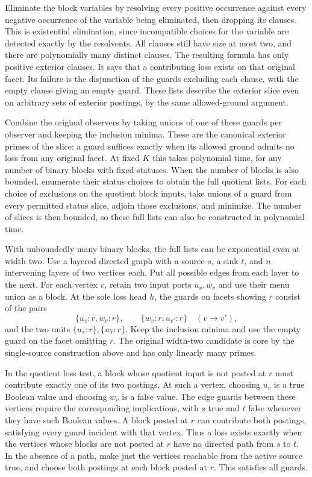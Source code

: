 Eliminate the block variables by resolving every
positive occurrence against every negative
occurrence of the variable being eliminated,
then dropping its clauses. This is existential
elimination, since incompatible choices for the
variable are detected exactly by the resolvents.
All clauses still have size at most two, and
there are polynomially many distinct clauses.
The resulting formula has only positive exterior
clauses. It says that a contributing loss exists
on that original facet. Its failure is the
disjunction of the guards excluding each clause,
with the empty clause giving an empty guard.
These lists describe the exterior slice even on
arbitrary sets of exterior postings, by the same
allowed-ground argument.

Combine the original observers by taking unions
of one of these guards per observer and keeping
the inclusion minima. These are the canonical
exterior primes of the slice: a guard suffices
exactly when its allowed ground admits no loss
from any original facet. At fixed $K$ this takes
polynomial time, for any number of binary blocks
with fixed statuses. When the number of blocks
is also bounded, enumerate their status choices
to obtain the full quotient lists. For each choice
of exclusions on the quotient block inputs, take
unions of a guard from every permitted status
slice, adjoin those exclusions, and minimize.
The number of slices is then bounded, so these
full lists can also be constructed in polynomial
time.

With unboundedly many binary blocks, the full lists
can be exponential even at width two. Use a layered
directed graph with a source $s$, a sink $t$, and
$n$ intervening layers of two vertices each. Put
all possible edges from each layer to the next.
For each vertex $v$, retain two input ports
$u_v,w_v$ and use their menu union as a block.
At the sole loss head $h$, the guards on facets
showing $r$ consist of the pairs
\[
 \{u_v{:}r,w_v{:}r\},\qquad
 \{w_v{:}r,u_{v'}{:}r\}\quad(v\to v'),
\]
and the two units $\{u_s{:}r\},\{w_t{:}r\}$.
Keep the inclusion minima and use the empty guard
on the facet omitting $r$. The original width-two
candidate is core by the single-source construction
above and has only linearly many primes.

In the quotient loss test, a block whose quotient
input is not posted at $r$ must contribute exactly
one of its two postings. At such a vertex, choosing
$u_v$ is a true Boolean value and choosing $w_v$
is a false value. The edge guards between these
vertices require the corresponding implications,
with $s$ true and $t$ false whenever they have
such Boolean values. A block posted at $r$ can
contribute both postings, satisfying every guard
incident with that vertex. Thus a loss exists
exactly when the vertices whose blocks are not
posted at $r$ have no directed path from $s$ to
$t$. In the absence of a path, make just the
vertices reachable from the active source true,
and choose both postings at each block posted at
$r$. This satisfies all guards.

